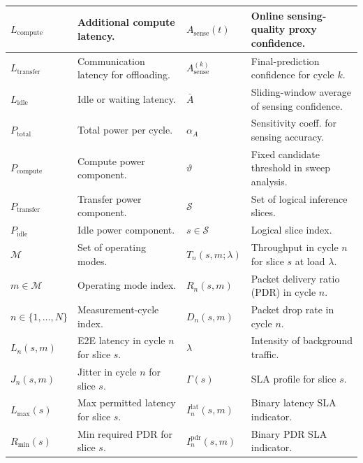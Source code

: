 \documentclass[journal]{IEEEtran}
\newcommand{\revblue}[1]{\textcolor{revblue}{#1}}
\begin{document}
\begin{table}[!t]
\begin{tabular}{|p{1.8cm}|p{5.7cm}|p{1.8cm}|p{5.7cm}|}
\hline
$L_{\text{compute}}$ & Additional compute latency. & 
\revblue{$A_{\text{sense}}(t)$} & \revblue{Online sensing-quality proxy confidence.} \\
\hline
$L_{\text{transfer}}$ & Communication latency for offloading. & 
\revblue{$A_{\text{sense}}^{(k)}$} & \revblue{Final-prediction confidence for cycle $k$.} \\
\hline
$L_{\text{idle}}$ & Idle or waiting latency. & 
\revblue{$\bar{A}$} & \revblue{Sliding-window average of sensing confidence.} \\
\hline
$P_{\text{total}}$ & Total power per cycle. & 
\revblue{$\alpha_A$} & \revblue{Sensitivity coeff. for sensing accuracy.} \\
\hline
$P_{\text{compute}}$ & Compute power component. & 
\revblue{$\vartheta$} & \revblue{Fixed candidate threshold in sweep analysis.} \\
\hline
$P_{\text{transfer}}$ & Transfer power component. & 
\revblue{$\mathcal{S}$} & \revblue{Set of logical inference slices.} \\
\hline
$P_{\text{idle}}$ & Idle power component. & 
\revblue{$s \in \mathcal{S}$} & \revblue{Logical slice index.} \\
\hline
\revblue{$\mathcal{M}$} & \revblue{Set of operating modes.} &
\revblue{$T_n(s,m;\lambda)$} & \revblue{Throughput in cycle $n$ for slice $s$ at load $\lambda$.} \\
\hline
\revblue{$m \in \mathcal{M}$} & \revblue{Operating mode index.} &
\revblue{$R_n(s,m)$} & \revblue{Packet delivery ratio (PDR) in cycle $n$.} \\
\hline
\revblue{$n \in \{1,\dots,N\}$} & \revblue{Measurement-cycle index.} &
\revblue{$D_n(s,m)$} & \revblue{Packet drop rate in cycle $n$.} \\
\hline
\revblue{$L_n(s,m)$} & \revblue{E2E latency in cycle $n$ for slice $s$.} &
\revblue{$\lambda$} & \revblue{Intensity of background traffic.} \\
\hline
\revblue{$J_n(s,m)$} & \revblue{Jitter in cycle $n$ for slice $s$.} &
\revblue{$\Gamma(s)$} & \revblue{SLA profile for slice $s$.} \\
\hline
\revblue{$L_{\max}(s)$} & \revblue{Max permitted latency for slice $s$.} &
\revblue{$I^{\mathrm{lat}}_n(s,m)$} & \revblue{Binary latency SLA indicator.} \\
\hline
\revblue{$R_{\min}(s)$} & \revblue{Min required PDR for slice $s$.} &
\revblue{$I^{\mathrm{pdr}}_n(s,m)$} & \revblue{Binary PDR SLA indicator.} \\

\end{tabular}
\end{table}
\end{document}
